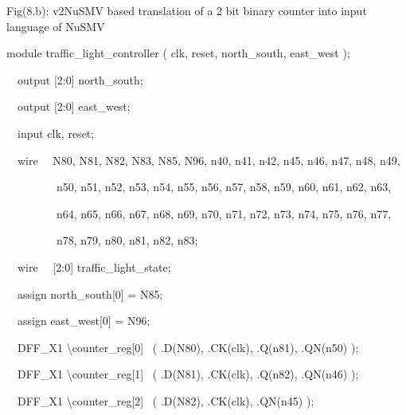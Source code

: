 \documentclass[a4paper]{article}
\begin{document}
\bigskip


\bigskip

{\centering\rmfamily\color[rgb]{0.0,0.0,0.039215688}
Fig(8.b): v2NuSMV based translation of a 2 bit binary counter into input
language of NuSMV
\par}


\bigskip


\bigskip



\begin{center}
\begin{minipage}{6.04653in}
{\ttfamily\color[rgb]{0.0,0.0,0.039215688}
module traffic\_light\_controller ( clk, reset, north\_south, east\_west
);}

{\ttfamily\color[rgb]{0.0,0.0,0.039215688}
\ \ output [2:0] north\_south;}

{\ttfamily\color[rgb]{0.0,0.0,0.039215688}
\ \ output [2:0] east\_west;}

{\ttfamily\color[rgb]{0.0,0.0,0.039215688}
\ \ input clk, reset;}

{\ttfamily\color[rgb]{0.0,0.0,0.039215688}
\ \ wire \ \ N80, N81, N82, N83, N85, N96, n40, n41, n42, n45, n46, n47,
n48, n49,}

{\ttfamily\color[rgb]{0.0,0.0,0.039215688}
\ \ \ \ \ \ \ \ \ n50, n51, n52, n53, n54, n55, n56, n57, n58, n59, n60,
n61, n62, n63,}

{\ttfamily\color[rgb]{0.0,0.0,0.039215688}
\ \ \ \ \ \ \ \ \ n64, n65, n66, n67, n68, n69, n70, n71, n72, n73, n74,
n75, n76, n77,}

{\ttfamily\color[rgb]{0.0,0.0,0.039215688}
\ \ \ \ \ \ \ \ \ n78, n79, n80, n81, n82, n83;}

{\ttfamily\color[rgb]{0.0,0.0,0.039215688}
\ \ wire \ \ [2:0] traffic\_light\_state;}

{\ttfamily\color[rgb]{0.0,0.0,0.039215688}
\ \ assign north\_south[0] = N85;}

{\ttfamily\color[rgb]{0.0,0.0,0.039215688}
\ \ assign east\_west[0] = N96;\ }


\bigskip

{\ttfamily\color[rgb]{0.0,0.0,0.039215688}
\ \ DFF\_X1 {\textbackslash}counter\_reg[0] \ ( .D(N80), .CK(clk),
.Q(n81), .QN(n50) );}

{\ttfamily\color[rgb]{0.0,0.0,0.039215688}
\ \ DFF\_X1 {\textbackslash}counter\_reg[1] \ ( .D(N81), .CK(clk),
.Q(n82), .QN(n46) );}

{\ttfamily\color[rgb]{0.0,0.0,0.039215688}
\ \ DFF\_X1 {\textbackslash}counter\_reg[2] \ ( .D(N82), .CK(clk),
.QN(n45) );}


\end{minipage}
\end{center}
\end{document}
